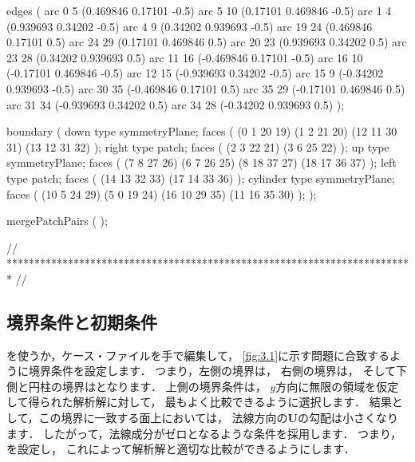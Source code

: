 \begin{OFverbatim}
edges           
(
    arc 0 5 (0.469846 0.17101 -0.5)
    arc 5 10 (0.17101 0.469846 -0.5)
    arc 1 4 (0.939693 0.34202 -0.5)
    arc 4 9 (0.34202 0.939693 -0.5)
    arc 19 24 (0.469846 0.17101 0.5)
    arc 24 29 (0.17101 0.469846 0.5)
    arc 20 23 (0.939693 0.34202 0.5)
    arc 23 28 (0.34202 0.939693 0.5)
    arc 11 16 (-0.469846 0.17101 -0.5)
    arc 16 10 (-0.17101 0.469846 -0.5)
    arc 12 15 (-0.939693 0.34202 -0.5)
    arc 15 9 (-0.34202 0.939693 -0.5)
    arc 30 35 (-0.469846 0.17101 0.5)
    arc 35 29 (-0.17101 0.469846 0.5)
    arc 31 34 (-0.939693 0.34202 0.5)
    arc 34 28 (-0.34202 0.939693 0.5)
);

boundary
(
    down
    {
        type symmetryPlane;
        faces
        (
            (0 1 20 19)
            (1 2 21 20)
            (12 11 30 31)
            (13 12 31 32)
        );
    }
    right
    {
        type patch;
        faces
        (
            (2 3 22 21)
            (3 6 25 22)
        );
    }
    up
    {
        type symmetryPlane;
        faces
        (
            (7 8 27 26)
            (6 7 26 25)
            (8 18 37 27)
            (18 17 36 37)
        );
    }
    left
    {
        type patch;
        faces
        (
            (14 13 32 33)
            (17 14 33 36)
        );
    }
    cylinder
    {
        type symmetryPlane;
        faces
        (
            (10 5 24 29)
            (5 0 19 24)
            (16 10 29 35)
            (11 16 35 30)
        );
    }
);

mergePatchPairs
(
);

// ************************************************************************* //
\end{OFverbatim}


\subsection{境界条件と初期条件}
\label{ssec:3.1.4}
を使うか，ケース・ファイルを手で編集して，
\autoref{fig:3.1}に示す問題に合致するように境界条件を設定します．
つまり，左側の境界は，
右側の境界は，
そして下側と円柱の境界はとなります．
上側の境界条件は，
$y$方向に無限の領域を仮定して得られた解析解に対して，
最もよく比較できるように選択します．
結果として，この境界に一致する面上においては，
法線方向の$\bm{U}$の勾配は小さくなります．
したがって，法線成分がゼロとなるような条件を採用します．
つまり，を設定し，
これによって解析解と適切な比較ができるようにします．


